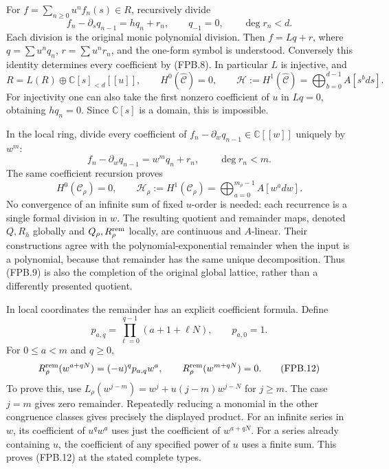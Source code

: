 For \(f=\sum_{n\ge0}u^nf_n(s)\in R\), recursively divide
\[
 f_n-\partial_s q_{n-1}=h q_n+r_n,
 \qquad q_{-1}=0,\qquad \deg r_n<d.
 \tag{FPB.8}\label{GraphV2:eq:fpb-global-division}
\]
Each division is the original monic polynomial division. Then
\(f=Lq+r\), where \(q=\sum u^nq_n\), \(r=\sum u^nr_n\), and the
one-form symbol is understood. Conversely this identity determines
every coefficient by (FPB.8). In particular \(L\) is injective, and
\[
 R=L(R)\oplus\mathbb{C}[s]_{<d}[[u]],\qquad
 H^0(\widehat{\mathcal C})=0,\qquad
 \mathcal H:=H^1(\widehat{\mathcal C})
       =\bigoplus_{b=0}^{d-1}A[s^bds].
 \tag{FPB.9}\label{GraphV2:eq:fpb-global-remainder}
\]
For injectivity one can also take the first nonzero coefficient of
\(u\) in \(Lq=0\), obtaining \(h q_n=0\). Since
\(\mathbb{C}[s]\) is a domain, this is impossible.

In the local ring, divide every coefficient of
\(f_n-\partial_wq_{n-1}\in\mathbb{C}[[w]]\) uniquely by \(w^m\):
\[
 f_n-\partial_wq_{n-1}=w^m q_n+r_n,
 \qquad \deg r_n<m.
 \tag{FPB.10}\label{GraphV2:eq:fpb-local-division}
\]
The same coefficient recursion proves
\[
 H^0(\mathcal C_\rho)=0,
 \qquad \mathcal H_\rho:=H^1(\mathcal C_\rho)
       =\bigoplus_{a=0}^{m_\rho-1}A[w^a dw].
 \tag{FPB.11}\label{GraphV2:eq:fpb-local-remainder}
\]
No convergence of an infinite sum of fixed \(u\)-order is needed:
each recurrence is a single formal division in \(w\). The resulting
quotient and remainder maps, denoted \(Q,R_h\) globally and
\(Q_\rho,R_\rho^{\rm rem}\) locally, are continuous and \(A\)-linear.
Their constructions agree with the polynomial-exponential remainder
when the input is a polynomial, because that remainder has the same
unique decomposition. Thus (FPB.9) is also the completion of the
original global lattice, rather than a differently presented quotient.

In local coordinates the remainder has an explicit coefficient
formula. Define
\[
 p_{a,q}=\prod_{\ell=0}^{q-1}(a+1+\ell N),\qquad p_{a,0}=1.
\]
For \(0\le a<m\) and \(q\ge0\),
\[
 R_\rho^{\rm rem}(w^{a+qN})=(-u)^q p_{a,q}w^a,
 \qquad
 R_\rho^{\rm rem}(w^{m+qN})=0.
 \tag{FPB.12}\label{GraphV2:eq:fpb-monomial-remainder}
\]
To prove this, use
\(L_\rho(w^{j-m})=w^j+u(j-m)w^{j-N}\) for \(j\ge m\).
The case \(j=m\) gives zero remainder. Repeatedly reducing a monomial
in the other congruence classes gives precisely the displayed product.
For an infinite series in \(w\), its coefficient of \(u^q w^a\)
uses just the coefficient of \(w^{a+qN}\). For a series already
containing \(u\), the coefficient of any specified power of \(u\)
uses a finite sum. This proves (FPB.12) at the stated complete types.


